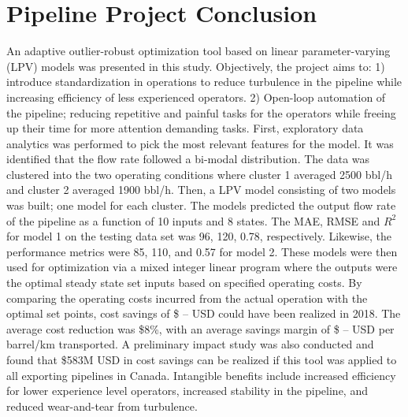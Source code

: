 \section{Pipeline Project Conclusion}
An adaptive outlier-robust optimization tool based on linear parameter-varying (LPV) models was presented in this study. Objectively, the project aims to: 1) introduce standardization in operations to reduce turbulence in the pipeline while increasing efficiency of less experienced operators. 2) Open-loop automation of the pipeline; reducing repetitive and painful tasks for the operators while freeing up their time for more attention demanding tasks.  First, exploratory data analytics was performed to pick the most relevant features for the model. It was identified that the flow rate followed a bi-modal distribution.  The data was clustered into the two operating conditions where cluster 1 averaged 2500 bbl/h and cluster 2 averaged 1900 bbl/h.  Then, a LPV model consisting of two models was built; one model for each cluster. The models predicted the output flow rate of the pipeline as a function of 10 inputs and 8 states. The MAE, RMSE and $R^2$ for model 1 on the testing data set was 96, 120, 0.78, respectively.  Likewise, the performance metrics were 85, 110, and 0.57 for model 2.  These models were then used for optimization via a mixed integer linear program where the outputs were the optimal steady state set inputs based on specified operating costs.  By comparing the operating costs incurred from the actual operation with the optimal set points, cost savings of \$ -- USD could have been realized in 2018.  The average cost reduction was \$8\%, with an average savings margin of \$ -- USD per barrel/km transported.  A preliminary impact study was also conducted and found that \$583M USD in cost savings can be realized if this tool was applied to all exporting pipelines in Canada. Intangible benefits include increased efficiency for lower experience level operators, increased stability in the pipeline, and reduced wear-and-tear from turbulence.
